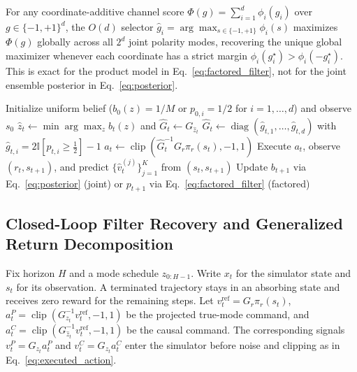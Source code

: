\documentclass[twoside,11pt]{article}
\newcommand{\gain}{G}
\newcommand{\clip}{\operatorname{clip}}
\begin{document}
\begin{proposition}
\label{prop:factored_exact}
For any coordinate-additive channel score $\Phi(g)=\sum_{i=1}^d \phi_i(g_i)$ over $g\in\{-1,+1\}^d$, the $O(d)$ selector $\hat g_i=\arg\max_{s\in\{-1,+1\}}\phi_i(s)$ maximizes $\Phi(g)$ globally across all $2^d$ joint polarity modes, recovering the unique global maximizer whenever each coordinate has a strict margin $\phi_i(g_i^\star)>\phi_i(-g_i^\star)$. This is exact for the product model in Eq.~\eqref{eq:factored_filter}, not for the joint ensemble posterior in Eq.~\eqref{eq:posterior}.
\end{proposition}

\begin{algorithm}[t]
\caption{BAPR deployment with joint or channel-factored filtering}
\label{alg:bapr}
\begin{algorithmic}[1]
\STATE Initialize uniform belief ($b_0(z)=1/M$ or $p_{0,i}=1/2$ for $i=1,\ldots,d$) and observe $s_0$
        \STATE $\hat z_t\leftarrow \min\arg\max_z b_t(z)$ and $\widehat{\gain}_t\leftarrow\gain_{\hat z_t}$
    \ELSE
        \STATE $\widehat{\gain}_t\leftarrow\operatorname{diag}(\hat g_{t,1},\ldots,\hat g_{t,d})$ with $\hat g_{t,i}=2\mathbb{I}[p_{t,i}\ge\tfrac12]-1$
    \ENDIF
    \STATE $a_t\leftarrow\clip\!\left(\widehat{\gain}_t^{-1}\gain_r\pi_r(s_t),-1,1\right)$
    \STATE Execute $a_t$, observe $(r_t,s_{t+1})$, and predict $\{\hat v_t^{(j)}\}_{j=1}^{K}$ from $(s_t,s_{t+1})$
    \STATE Update $b_{t+1}$ via Eq.~\eqref{eq:posterior} (joint) or $p_{t+1}$ via Eq.~\eqref{eq:factored_filter} (factored)
\ENDFOR
\end{algorithmic}
\end{algorithm}

\subsection{Closed-Loop Filter Recovery and Generalized Return Decomposition}

Fix horizon $H$ and a mode schedule $z_{0:H-1}$. Write $x_t$ for the simulator state and $s_t$ for its observation. A terminated trajectory stays in an absorbing state and receives zero reward for the remaining steps. Let $v_t^{\mathrm{ref}}=\gain_r\pi_r(s_t)$, $a_t^P=\clip(\gain_{z_t}^{-1}v_t^{\mathrm{ref}},-1,1)$ be the projected true-mode command, and $a_t^C=\clip(\gain_{\hat z_t}^{-1}v_t^{\mathrm{ref}},-1,1)$ be the causal command. The corresponding signals $v_t^P=\gain_{z_t}a_t^P$ and $v_t^C=\gain_{z_t}a_t^C$ enter the simulator before noise and clipping as in Eq.~\eqref{eq:executed_action}.
\end{document}
